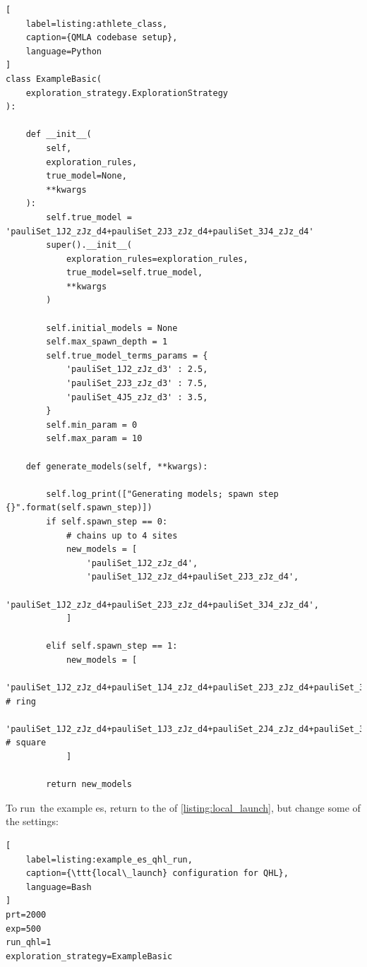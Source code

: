 \begin{lstlisting}[
    label=listing:athlete_class,
    caption={QMLA codebase setup},
    language=Python
]
class ExampleBasic(
    exploration_strategy.ExplorationStrategy
):

    def __init__(
        self,
        exploration_rules,
        true_model=None,
        **kwargs
    ):
        self.true_model = 'pauliSet_1J2_zJz_d4+pauliSet_2J3_zJz_d4+pauliSet_3J4_zJz_d4'
        super().__init__(
            exploration_rules=exploration_rules,
            true_model=self.true_model,
            **kwargs
        )

        self.initial_models = None
        self.max_spawn_depth = 1
        self.true_model_terms_params = {
            'pauliSet_1J2_zJz_d3' : 2.5,
            'pauliSet_2J3_zJz_d3' : 7.5,
            'pauliSet_4J5_zJz_d3' : 3.5,
        }
        self.min_param = 0
        self.max_param = 10

    def generate_models(self, **kwargs):

        self.log_print(["Generating models; spawn step {}".format(self.spawn_step)])
        if self.spawn_step == 0:
            # chains up to 4 sites
            new_models = [
                'pauliSet_1J2_zJz_d4',
                'pauliSet_1J2_zJz_d4+pauliSet_2J3_zJz_d4',
                'pauliSet_1J2_zJz_d4+pauliSet_2J3_zJz_d4+pauliSet_3J4_zJz_d4',
            ]
            
        elif self.spawn_step == 1:
            new_models = [
                'pauliSet_1J2_zJz_d4+pauliSet_1J4_zJz_d4+pauliSet_2J3_zJz_d4+pauliSet_3J4_zJz_d4', # ring
                'pauliSet_1J2_zJz_d4+pauliSet_1J3_zJz_d4+pauliSet_2J4_zJz_d4+pauliSet_3J4_zJz_d4', # square
            ]

        return new_models

\end{lstlisting}


To run\footnotemark \ the example \gls{es}, return to the  of \cref{listing:local_launch}, 
    but change some of the settings:
\begin{lstlisting}[
    label=listing:example_es_qhl_run,
    caption={\ttt{local\_launch} configuration for QHL},
    language=Bash
]
prt=2000
exp=500
run_qhl=1
exploration_strategy=ExampleBasic
\end{lstlisting}

